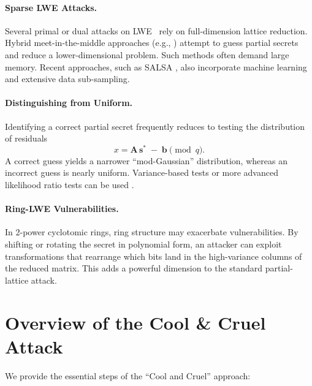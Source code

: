 \documentclass[11pt]{article}
\begin{document}
\paragraph{Sparse LWE Attacks.}
Several primal or dual attacks on LWE~\cite{regev,bkz2,flatter} rely on full-dimension lattice reduction. Hybrid meet-in-the-middle approaches (e.g., \cite{ref_mitm}) attempt to guess partial secrets and reduce a lower-dimensional problem. Such methods often demand large memory. Recent approaches, such as SALSA \cite{salsa}, also incorporate machine learning and extensive data sub-sampling.

\paragraph{Distinguishing from Uniform.}
Identifying a correct partial secret frequently reduces to testing the distribution of residuals
\[
x = \mathbf{A}\,\mathbf{s}^* \;-\; \mathbf{b} \pmod{q}.
\]
A correct guess yields a narrower ``mod-Gaussian'' distribution, whereas an incorrect guess is nearly uniform. Variance-based tests or more advanced likelihood ratio tests can be used \cite{ref_largen}.

\paragraph{Ring-LWE Vulnerabilities.}
In 2-power cyclotomic rings, ring structure may exacerbate vulnerabilities. By shifting or rotating the secret in polynomial form, an attacker can exploit transformations that rearrange which bits land in the high-variance columns of the reduced matrix. This adds a powerful dimension to the standard partial-lattice attack.

\section{Overview of the Cool \& Cruel Attack}
\label{sec:attack_overview}
We provide the essential steps of the ``Cool and Cruel'' approach:
\end{document}
